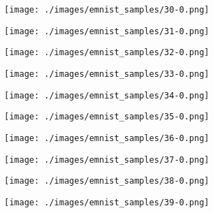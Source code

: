 \begin{figure}[H]
    \par\medskip

    \begin{subfigure}{.10\textwidth}
        \centering
        \texttt{[image: ./images/emnist\_samples/30-0.png]}
    \end{subfigure}%
    \begin{subfigure}{.10\textwidth}
        \centering
        \texttt{[image: ./images/emnist\_samples/31-0.png]}
    \end{subfigure}%
    \begin{subfigure}{.10\textwidth}
        \centering
        \texttt{[image: ./images/emnist\_samples/32-0.png]}
    \end{subfigure}%
    \begin{subfigure}{.10\textwidth}
        \centering
        \texttt{[image: ./images/emnist\_samples/33-0.png]}
    \end{subfigure}%
    \begin{subfigure}{.10\textwidth}
        \centering
        \texttt{[image: ./images/emnist\_samples/34-0.png]}
    \end{subfigure}%
    \begin{subfigure}{.10\textwidth}
        \centering
        \texttt{[image: ./images/emnist\_samples/35-0.png]}
    \end{subfigure}%
    \begin{subfigure}{.10\textwidth}
        \centering
        \texttt{[image: ./images/emnist\_samples/36-0.png]}
    \end{subfigure}%
    \begin{subfigure}{.10\textwidth}
        \centering
        \texttt{[image: ./images/emnist\_samples/37-0.png]}
    \end{subfigure}%
    \begin{subfigure}{.10\textwidth}
        \centering
        \texttt{[image: ./images/emnist\_samples/38-0.png]}
    \end{subfigure}%
    \begin{subfigure}{.10\textwidth}
        \centering
        \texttt{[image: ./images/emnist\_samples/39-0.png]}
    \end{subfigure}%


\end{figure}
